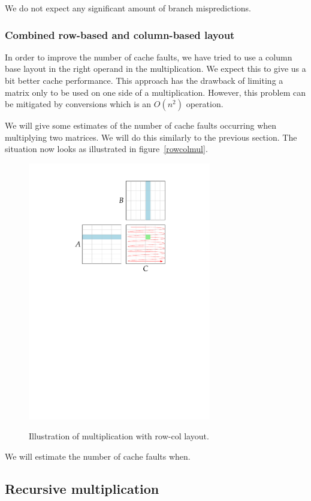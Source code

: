 We do not expect any significant amount of branch mispredictions.

\subsubsection{Combined row-based and column-based layout}

In order to improve the number of cache faults, we have tried to use a
column base layout in the right operand in the multiplication. We
expect this to give us a bit better cache performance. This approach
has the drawback of limiting a matrix only to be used on one side of a
multiplication. However, this problem can be mitigated by conversions
which is an $O(n^2)$ operation.

We will give some estimates of the number of cache faults occurring
when multiplying two matrices. We will do this similarly to the
previous section. The situation now looks as illustrated in
figure~\ref{rowcolmul}.
\begin{figure}[h!]
  \centering
  \includegraphics[width=8cm]{images/rowcolmul}
  \label{fig:colowmul}
  \caption{Illustration of multiplication with row-col layout.}
\end{figure}

We will estimate the number of cache faults when.

\subsection{Recursive multiplication}

